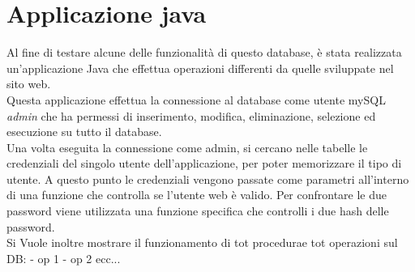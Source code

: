 \documentclass[12pt,a4paper]{article}
\begin{document}
    \newpage
    \section{Applicazione java}
    Al fine di testare alcune delle funzionalità di questo database, è stata realizzata un'applicazione Java che effettua operazioni differenti da quelle sviluppate nel sito web.\\
    Questa applicazione effettua la connessione al database come utente mySQL \textit{admin} che ha permessi di inserimento, modifica, eliminazione, selezione ed esecuzione su tutto il database.\\
    Una volta eseguita la connessione come admin, si cercano nelle tabelle le credenziali del singolo utente dell'applicazione, per poter memorizzare il tipo di utente. A questo punto le credenziali vengono passate come parametri all'interno di una funzione che controlla se l'utente web è valido. Per confrontare le due password viene utilizzata una funzione specifica che controlli i due hash delle password.\\
    Si Vuole inoltre mostrare il funzionamento di tot procedurae  tot operazioni sul DB:
    - op 1
    - op 2 
    ecc...
    
\end{document}

